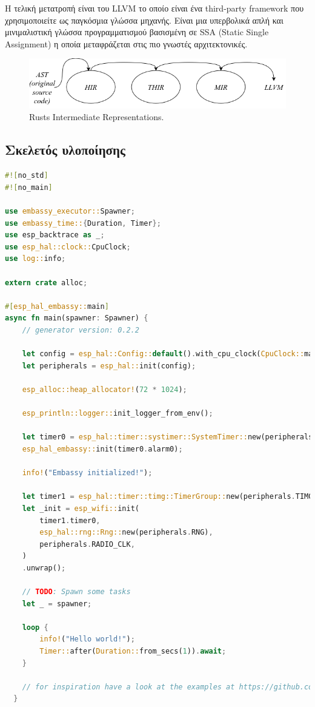 Η τελική μετατροπή είναι του LLVM το οποίο είναι ένα third-party framework που χρησιμοποιείτε ως
παγκόσμια γλώσσα μηχανής. Είναι μια υπερβολικά απλή και μινιμαλιστική γλώσσα προγραμματισμού βασισμένη
σε SSA (Static Single Assignment) η οποία μεταφράζεται στις πιο γνωστές αρχιτεκτονικές.

\begin{figure}
    \centering
    \includegraphics[scale=0.4]{images/rust/rust_irs.png}
    \caption{Rusts Intermediate Representations.}
    \label{fig:rust_ir}
\end{figure}

\subsection{Σκελετός υλοποίησης}


\begin{lstlisting}[language=Rust]
#![no_std]
#![no_main]

use embassy_executor::Spawner;
use embassy_time::{Duration, Timer};
use esp_backtrace as _;
use esp_hal::clock::CpuClock;
use log::info;

extern crate alloc;

#[esp_hal_embassy::main]
async fn main(spawner: Spawner) {
    // generator version: 0.2.2

    let config = esp_hal::Config::default().with_cpu_clock(CpuClock::max());
    let peripherals = esp_hal::init(config);

    esp_alloc::heap_allocator!(72 * 1024);

    esp_println::logger::init_logger_from_env();

    let timer0 = esp_hal::timer::systimer::SystemTimer::new(peripherals.SYSTIMER);
    esp_hal_embassy::init(timer0.alarm0);

    info!("Embassy initialized!");

    let timer1 = esp_hal::timer::timg::TimerGroup::new(peripherals.TIMG0);
    let _init = esp_wifi::init(
        timer1.timer0,
        esp_hal::rng::Rng::new(peripherals.RNG),
        peripherals.RADIO_CLK,
    )
    .unwrap();

    // TODO: Spawn some tasks
    let _ = spawner;

    loop {
        info!("Hello world!");
        Timer::after(Duration::from_secs(1)).await;
    }

    // for inspiration have a look at the examples at https://github.com/esp-rs/esp-hal/tree/v0.23.1/examples/src/bin
  }  
  \end{lstlisting}
    
